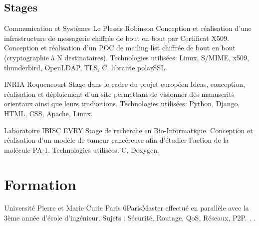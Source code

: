 \documentclass[10pt,a4paper]{moderncv}
\begin{document}
\subsection{Stages}

              {Communication et Systèmes}
              {Le Plessis Robinson}
              {}
              {Conception et réalisation d'une infrastructure de messagerie chiffrée de bout en bout par
               Certificat X509. Conception et réalisation d'un POC de mailing list chiffrée de bout en bout
               (cryptographie à N destinataires).
               \newline Technologies utilisées: Linux, S/MIME, x509, thunderbird, OpenLDAP, TLS, C, librairie polarSSL.
              }

              {INRIA}
              {Roquencourt}
              {}
              {Stage dans le cadre du projet européen Ideas, 
                 conception, réalisation et déploiement d'un site permettant de visionner 
                 des manuscrits orientaux ainsi que leurs traductions.
                 \newline Technologies utilisées: Python, Django, HTML, CSS, Apache, Linux.
              }

              {Laboratoire IBISC}
              {EVRY}
              {}
              {Stage de recherche en Bio-Informatique. Conception
                et réalisation d'un modèle de tumeur
                cancéreuse afin d'étudier l'action de la molécule PA-1.
                \newline Technologies utilisées: C, Doxygen.
              }


\section{Formation}
{Université Pierre et Marie Curie Paris 6}{Paris}{}{Master effectué en parallèle avec la 3ème année d’école d’ingénieur. Sujets : Sécurité, Routage,
QoS, Réseaux, P2P. . .}
\end{document}
